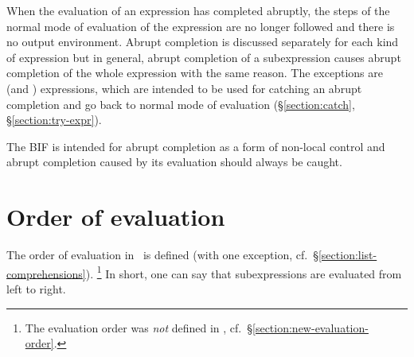 When the evaluation of an expression has completed abruptly, the steps
of the normal mode of evaluation of the expression are no longer
followed and there is no output environment.  Abrupt completion is
discussed separately for each kind of expression but in general,
abrupt completion of a subexpression causes abrupt completion of the
whole expression with the same reason.  The exceptions are
\ifStd{} (and
) \else
{} \fi
expressions, which are intended to be used for catching an abrupt
completion and go back to normal mode of evaluation
(\S\ref{section:catch}\ifStd, \S\ref{section:try-expr}\fi).

The BIF  is intended for abrupt completion as a form of non-local
control and abrupt completion caused by its evaluation should always
be caught.

\section{Order of evaluation}

\label{section:evorder}

\ifStd
The order of evaluation in \StdErlang\ is defined (with one exception,
cf.~\S\ref{section:list-comprehensions}).
\ifDiff\footnote{The evaluation order was
\emph{not} defined in \OldErlang, cf.~\S\ref{section:new-evaluation-order}.}\fi
In short, one can say that subexpressions are evaluated from left to
right.

